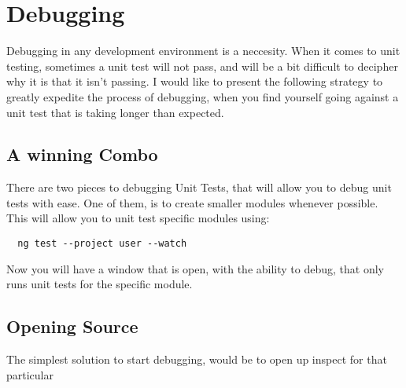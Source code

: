 \maketitle{}
\section{ Debugging }

Debugging in any development environment is a neccesity. When it comes to unit
testing, sometimes a unit test will not pass, and will be a bit difficult to
decipher why it is that it isn't passing. I would like to present the following
strategy to greatly expedite the process of debugging, when you find yourself
going against a unit test that is taking longer than expected.

\subsection{ A winning Combo }
There are two pieces to debugging Unit Tests, that will allow you to debug unit
tests with ease. One of them, is to create smaller modules whenever possible.
This will allow you to unit test specific modules using:
\begin{verbatim}
  ng test --project user --watch
\end{verbatim}

Now you will have a window that is open, with the ability to debug, that only
runs unit tests for the specific module.

\subsection{ Opening Source }
The simplest solution to start debugging, would be to open up inspect for that
particular

